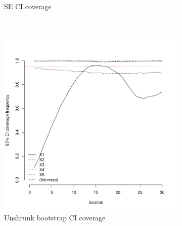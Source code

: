 \documentclass[authoryear, review, 11pt]{elsarticle}
\begin{document}
\begin{figure}
\begin{subfigure}[b]{0.45\textwidth}
		\caption{SE CI coverage}
	\end{subfigure}%
	\\%
	\begin{subfigure}[b]{0.45\textwidth}
	\centering
		\includegraphics[width=\textwidth]{../../figures/simulation/15.2.profile_unshrunk_bootstrap_coverage.pdf}
		\caption{Unshrunk bootstrap CI coverage}
	\end{subfigure}%
	~ %
	\begin{subfigure}[b]{0.45\textwidth}
	\centering

\end{subfigure}
\end{figure}
\end{document}
